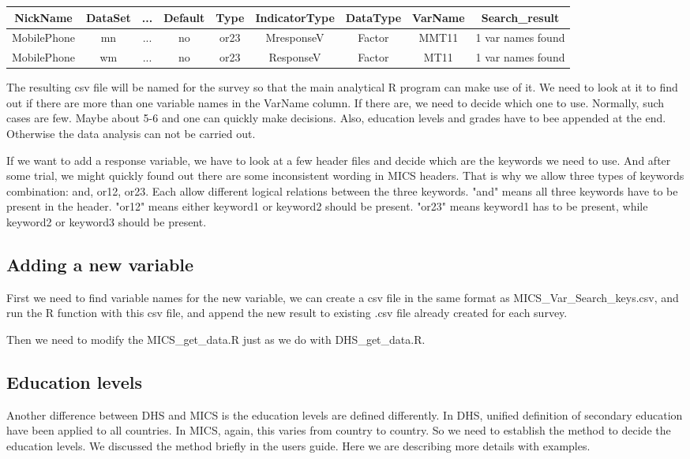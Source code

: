 \documentclass[12pt]{article}
\begin{document}
{\small 
	\begin{tabular}{ccccccccc}
		NickName& DataSet& ... & Default & Type & IndicatorType & DataType & VarName & Search\_result
		\\
		\hline
		MobilePhone& mn& ... & no & or23 & MresponseV & Factor & MMT11 &	1 var names found
		\\	
		MobilePhone& wm& ... & no & or23 & ResponseV & Factor & MT11 &	1 var names found \\	
		
	\end{tabular}
}
  
The resulting csv file will be named for the survey so that the main analytical R program can make use of it. We need to look at it to find out if there are more than one variable names in the VarName column. If there are, we need to decide which one to use. Normally, such cases are few. Maybe about 5-6 and one can quickly make decisions. Also, education levels and grades have to bee appended at the end. Otherwise the data analysis can not be carried out.

If we want to add a response variable, we have to look at a few header files and decide which are the keywords we need to use. And after some trial, we might quickly found out there are some inconsistent wording in MICS headers. That is why we allow three types of keywords combination: and, or12, or23. Each allow different logical relations between the three keywords. "and" means all three keywords have to be present in the header. "or12" means either keyword1 or keyword2 should be present. "or23" means keyword1 has to be present, while keyword2 or keyword3 should be present.

\subsection{Adding a new variable}
First we need to find variable names for the new variable, we can create a csv file in the same format as  MICS\_Var\_Search\_keys.csv, and run the R function with this csv file, and append the new result to existing .csv file already created for each survey.

Then we need to modify the MICS\_get\_data.R just as we do with DHS\_get\_data.R.

\subsection{Education levels}
Another difference between DHS and MICS is the education levels are defined differently. In DHS, unified definition of secondary education have been applied to all countries. In MICS, again, this varies from country to country. So we need to establish the method to decide the education levels. We discussed the method briefly in the users guide. Here we are describing more details with examples.
\end{document}
